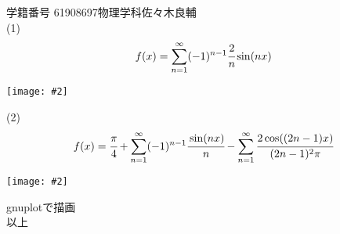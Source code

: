 \documentclass[uplatex,a4j,11pt]{jsarticle}
\makeatletter
\def\fgcaption{\def\@captype{figure}\caption}
\newcommand{\mfig}[3][width=15cm]{
\begin{center}
\texttt{[image: \#2]}
\fgcaption{#3 \label{fig:#2}}
\end{center}
}
\makeatother
\begin{document}
学籍番号 61908697\qquad 物理学科\qquad 佐々木良輔\\
(1)\\
\begin{align}
  f(x)=\sum_{n=1}^{\infty}(-1)^{n-1}\cfrac{2}{n}\sin(nx)
\end{align}
\mfig[width=12cm]{fig1.eps}{$f(x)$と1次, 5次, 9次の級数}
\newpage
(2)\\
\begin{align}
  f(x)=\cfrac{\pi}{4}+\sum_{n=1}^{\infty}(-1)^{n-1}\cfrac{\sin(nx)}{n}-\sum_{n=1}^{\infty}\cfrac{2\cos((2n-1)x)}{(2n-1)^2\pi}
\end{align}
\mfig[width=12cm]{fig2.eps}{$f(x)$と1次, 5次, 9次の級数}
\begin{flushright}
  gnuplotで描画\\以上
\end{flushright}
\end{document}
